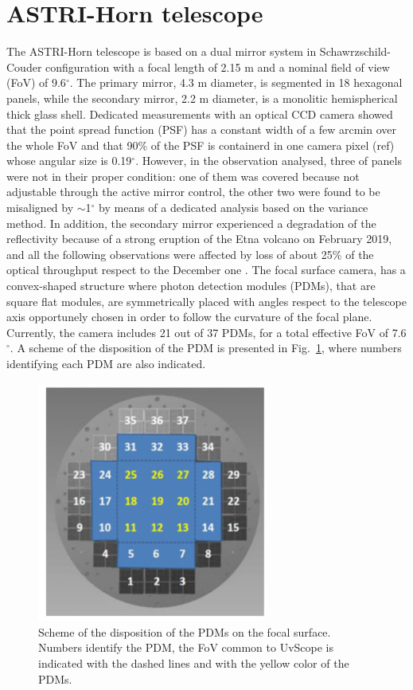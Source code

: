 \section{ASTRI-Horn telescope} 
The ASTRI-Horn telescope is based on a dual mirror system in Schawrzschild-Couder configuration
with a focal length of 2.15 m and a nominal field of view (FoV) of 9.6$^\circ$. 
The primary mirror, 4.3 m diameter, is segmented in 18 hexagonal panels, 
while the secondary mirror, 2.2 m diameter, is a monolitic hemispherical thick glass shell. 
Dedicated measurements  with an optical CCD camera showed that the
point spread function (PSF) has a constant width of a few arcmin
over the whole FoV and that  90\% of the PSF  is containerd in one camera pixel (ref)
whose angular size is 0.19$^\circ$. 
However, in the observation analysed, three of panels were not in their proper condition:
one of them was covered because not adjustable through the active mirror control, the other two were found to be misaligned by $\sim$1$^\circ$ by means of a dedicated analysis based on the variance method.
In addition, the secondary mirror experienced a degradation of the reflectivity because of a strong eruption of the Etna volcano on February 2019, and all the following observations were affected by loss of about 25\% of the optical throughput
respect to the December one \cite{Mineo2019}. 
The focal surface camera, has a convex-shaped structure where photon detection modules (PDMs), that are square flat modules, are symmetrically placed with angles respect to the telescope axis opportunely chosen in order to follow the curvature of the focal plane.
Currently, the camera includes 21 out of 37 PDMs, for a total effective FoV of 7.6$^\circ$.
A scheme of the disposition of the PDM is presented in Fig.~\ref{fig:camera}, where numbers identifying each PDM are also indicated. 
\begin{figure}
\includegraphics[height=7.9cm,angle=0,scale=1.0]{Figure/focal_plane.pdf}
\caption{Scheme of the disposition of the PDMs on the focal surface. Numbers identify the PDM, the FoV common to UvScope is indicated with the dashed lines and with the yellow color of the PDMs.}
\label{fig:camera}
\end{figure}

